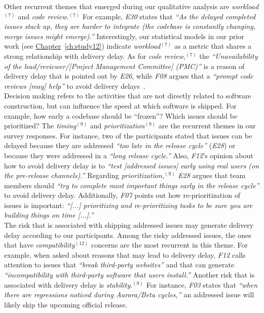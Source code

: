 \begin{sloppypar}
Other recurrent themes that emerged during our qualitative analysis are {\em
workload}$^{(7)}$ and {\em code review}.$^{(7)}$ For example, {\em E30} states
that {\em ``As the delayed completed issues stack up, they are harder to
integrate (the codebase is constantly changing, merge issues might emerge).''}
Interestingly, our statistical models in our prior work (see
\hyperref[ch:study12]{Chapter}~\ref{ch:study12})
indicate {\em workload}$^{(7)}$ as a metric that shares a strong relationship
with delivery delay. As for {\em code review},$^{(7)}$ the {\em
``Unavailability of the lead/reviewer/[Project Management Committee] (PMC)''} is
a reason of delivery delay that is pointed out by {\em E26}, while {\em F08}
argues that a {\em ``prompt code reviews [may] help''} to avoid delivery
delays~\cite{mcintosh2016emse}.\\

\noindent\DIFdelbegin \textit{\textbf{}%
}%
\DIFdelend \DIFaddbegin {} \DIFaddend Decision making refers to the
activities that are not directly related to software construction, but can
influence the speed at which software is shipped. For example, how early a
codebase should be ``frozen''? Which issues should be prioritized? The {\em
timing}$^{(9)}$ and {\em prioritization}$^{(9)}$ are the recurrent themes in
our survey responses. For instance, two of the participants stated that issues
can be delayed because they are addressed {\em ``too late in the release
cycle''} ({\em E28}) or because they were addressed in a {\em ``long release
cycle.''} Also, {\em F12}'s opinion about how to avoid delivery delay is to
{\em ``test [addressed issues] early using real users (\eg on the pre-release
channels).''} Regarding {\em prioritization},$^{(9)}$ {\em E28} argues that team
members should {\em ``try to complete most important things early in the release
cycle''} to avoid delivery delay. Additionally, {\em F07} points out how
re-prioritization of issues is important: {\em ``[...] prioritizing and
re-prioritizing tasks to be sure you are building things on time [...].''}\\

\noindent\DIFdelbegin \textit{\textbf{}%
}%
\DIFdelend \DIFaddbegin {} \DIFaddend The risk that is associated with shipping
addressed issues may generate delivery delay according to our participants.
Among the risky addressed issues, the ones that have {\em
compatibility}$^{(12)}$ concerns are the most recurrent in this theme. For
example, when asked about reasons that may lead to delivery delay, {\em F12}
calls attention to issues that {\em ``break third-party websites''} and that can
generate {\em ``incompatibility with third-party software that users install.''}
Another risk that is associated with delivery delay is {\em stability}.$^{(9)}$
For instance, {\em F03} states that {\em ``when there are regressions noticed
during Aurora/Beta cycles,''} an addressed issue will likely skip the upcoming
official release.\\


\end{sloppypar}
